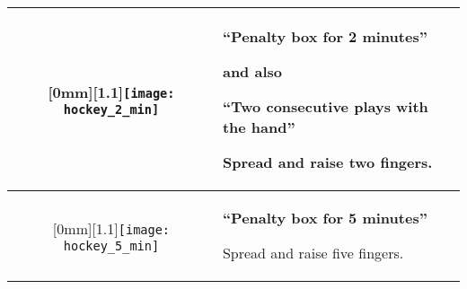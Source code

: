 \begin{longtable}{|c|p{10.8cm}|}
\hline %

\raisebox{-\height}[0mm][1.1\height]{\texttt{[image: hockey\_2\_min]}}
&
\textbf{``Penalty box for 2 minutes''}

and also

\textbf{``Two consecutive plays with the hand''}

Spread and raise two fingers.\\

\hline %

\raisebox{-\height}[0mm][1.1\height]{\texttt{[image: hockey\_5\_min]}}
  &
\textbf{``Penalty box for 5 minutes''}

Spread and raise five fingers.\\

\hline %


\end{longtable}
\renewcommand{\arraystretch}{1}
